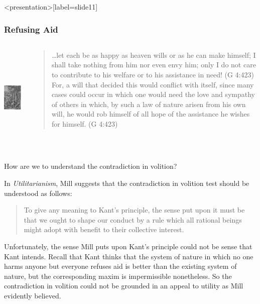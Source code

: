 \begin{frame}<presentation>[label=slide11]
    \frametitle{Refusing Aid}
        \begin{columns}
            \begin{column}{3cm}
                \includegraphics[height=5cm]{../../graphics/samaritan.jpg}
            \end{column}
            \begin{column}{7cm}
                \begin{quote}
                    \ldots let each be as happy as heaven wills or as he can make himself; I shall take nothing from him nor even envy him; only I do not care to contribute to his welfare or to his assistance in need! (G 4:423)\\
                    For, a will that decided this would conflict with itself, since many cases could occur in which one would need the love and sympathy of others in which, by such a law of nature arisen from his own will, he would rob himself of all hope of the assistance he wishes for himself. (G 4:423) 
                \end{quote}
            \end{column}
        \end{columns}
\end{frame}

How are we to understand the contradiction in volition?

In \emph{Utilitarianism}, Mill suggests that the contradiction in volition test should be understood as follows:

\begin{quote}
	To give any meaning to Kant's principle, the sense put upon it must be that we ought to shape our conduct by a rule which all rational beings might adopt with benefit to their collective interest.
\end{quote}

Unfortunately, the sense Mill puts upon Kant's principle could not be sense that Kant intends. Recall that Kant thinks that the system of nature in which no one harms anyone but everyone refuses aid is better than the existing system of nature, but the corresponding maxim is impermissible nonetheless. So the contradiction in volition could not be grounded in an appeal to utility as Mill evidently believed. \change

